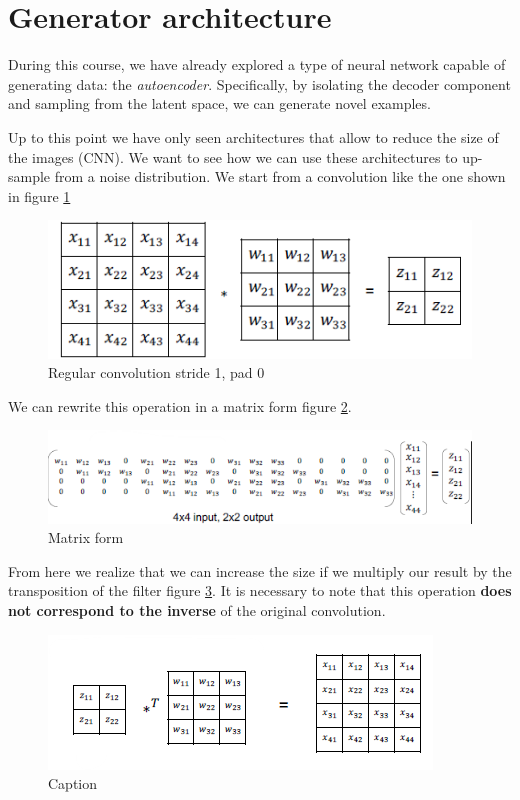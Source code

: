 \section{Generator architecture}
During this course, we have already explored a type of neural network capable of
generating data: the \textit{autoencoder}. Specifically, by isolating the decoder
component and sampling from the latent space, we can generate novel examples.

Up to this point we have only seen architectures that allow to reduce the size
of the images (CNN). We want to see how we can use these architectures to up-sample
from  a noise distribution. We start from a convolution like the one shown in
figure \ref{fig:reg-conv}

\begin{figure}[!ht]
    \centering
    \includegraphics[width=0.5\linewidth]{img/GAN/RegularConv.png}
    \caption{Regular convolution stride 1, pad 0}
    \label{fig:reg-conv}
\end{figure}

We can rewrite this operation in a matrix form figure \ref{fig:conmat}.

\begin{figure}[!ht]
    \centering
    \includegraphics[width=0.5\linewidth]{img/GAN/matrix-vector.png}
    \caption{Matrix form}
    \label{fig:conmat}
\end{figure}

From here we realize that we can increase the size if we multiply our result by
the transposition of the filter figure \ref{fig:traConv}. It is necessary to note
that this operation \textbf{does not correspond to the inverse} of the original
convolution.

\begin{figure}[!ht]
    \centering
    \includegraphics[width=0.5\linewidth]{img/GAN/transposeConv.png}
    \caption{Caption}
    \label{fig:traConv}
\end{figure}

